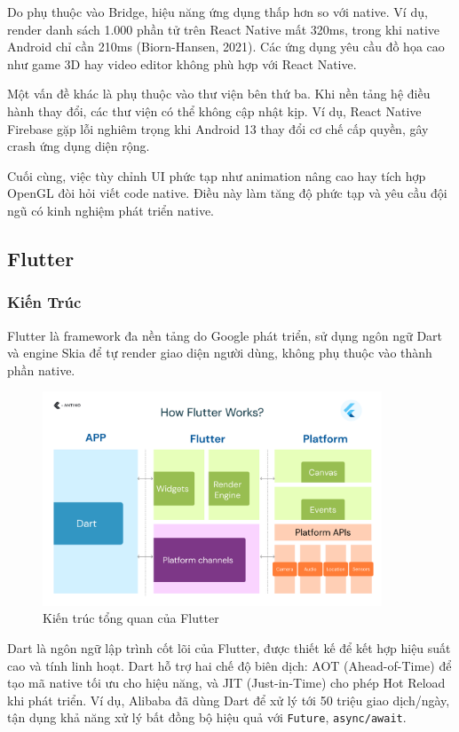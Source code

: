 Do phụ thuộc vào Bridge, hiệu năng ứng dụng thấp hơn so với native.  
Ví dụ, render danh sách 1.000 phần tử trên React Native mất 320ms, trong khi native Android chỉ cần 210ms (Biorn-Hansen, 2021).  
Các ứng dụng yêu cầu đồ họa cao như game 3D hay video editor không phù hợp với React Native.

Một vấn đề khác là phụ thuộc vào thư viện bên thứ ba.  
Khi nền tảng hệ điều hành thay đổi, các thư viện có thể không cập nhật kịp.  
Ví dụ, React Native Firebase gặp lỗi nghiêm trọng khi Android 13 thay đổi cơ chế cấp quyền, gây crash ứng dụng diện rộng.

Cuối cùng, việc tùy chỉnh UI phức tạp như animation nâng cao hay tích hợp OpenGL đòi hỏi viết code native.  
Điều này làm tăng độ phức tạp và yêu cầu đội ngũ có kinh nghiệm phát triển native.

\subsection{Flutter}
\renewcommand{\labelitemi}{--}    
\subsubsection{Kiến Trúc}

Flutter là framework đa nền tảng do Google phát triển, sử dụng ngôn ngữ Dart và engine Skia để tự render giao diện người dùng, không phụ thuộc vào thành phần native.

\begin{figure}[H]
    \centering
    \includegraphics[width=0.9\textwidth]{images/flutter.png}
    \caption{Kiến trúc tổng quan của Flutter}
\end{figure}

Dart là ngôn ngữ lập trình cốt lõi của Flutter, được thiết kế để kết hợp hiệu suất cao và tính linh hoạt.  
Dart hỗ trợ hai chế độ biên dịch: AOT (Ahead-of-Time) để tạo mã native tối ưu cho hiệu năng, và JIT (Just-in-Time) cho phép Hot Reload khi phát triển.  
Ví dụ, Alibaba đã dùng Dart để xử lý tới 50 triệu giao dịch/ngày, tận dụng khả năng xử lý bất đồng bộ hiệu quả với \texttt{Future}, \texttt{async/await}.

